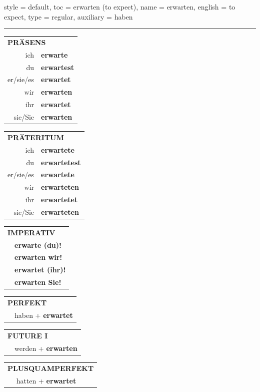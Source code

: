 \begin{verbentry}{
  style = {default},
  toc = {erwarten (to expect)},
  name = {erwarten},
  english = {to expect},
  type = {regular},
  auxiliary = {haben}
}


\vspace{5pt}
\hrule
\vspace{5pt}

\begin{tabular}{rl}
\multicolumn{2}{l}{\textbf{PRÄSENS}}\\
ich & \textbf{erwarte}\\
du & \textbf{erwartest}\\
er/sie/es & \textbf{erwartet}\\
wir & \textbf{erwarten}\\
ihr & \textbf{erwartet}\\
sie/Sie & \textbf{erwarten}\\
\end{tabular}
\hfill
\begin{tabular}{rl}
\multicolumn{2}{l}{\textbf{PRÄTERITUM}}\\
ich & \textbf{erwartete}\\
du & \textbf{erwartetest}\\
er/sie/es & \textbf{erwartete}\\
wir & \textbf{erwarteten}\\
ihr & \textbf{erwartetet}\\
sie/Sie & \textbf{erwarteten}\\
\end{tabular}
\hfill
\begin{tabular}{rl}
\multicolumn{2}{l}{\textbf{IMPERATIV}}\\
& \textbf{erwarte (du)!}\\
& \textbf{erwarten wir!}\\
& \textbf{erwartet (ihr)!}\\
& \textbf{erwarten Sie!}\\
\end{tabular}

\vspace{10pt}

\begin{tabular}{rl}
\multicolumn{2}{l}{\textbf{PERFEKT}}\\
& haben + \textbf{erwartet}\\
\end{tabular}
\hfill
\begin{tabular}{rl}
\multicolumn{2}{l}{\textbf{FUTURE I}}\\
& werden + \textbf{erwarten}\\
\end{tabular}
\hfill
\begin{tabular}{rl}
\multicolumn{2}{l}{\textbf{PLUSQUAMPERFEKT}}\\
& hatten + \textbf{erwartet}\\
\end{tabular}


\end{verbentry}
